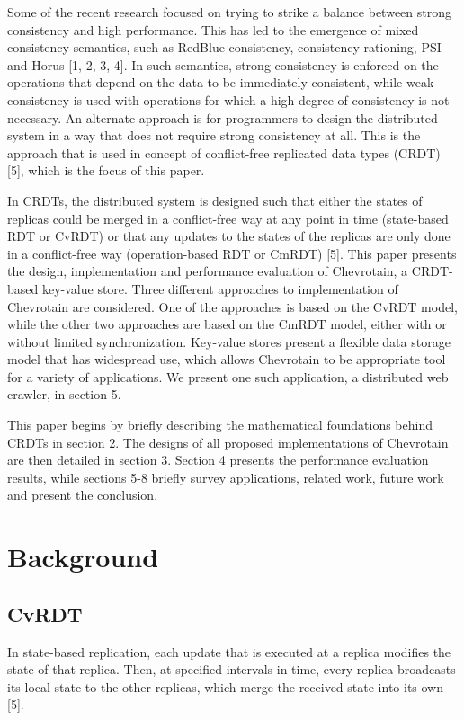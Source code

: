 \documentclass[sigconf,nonacm,10pt]{acmart}
\begin{document}
Some of the recent research focused on trying to strike a balance between strong consistency and high performance. This has led to the emergence of mixed consistency semantics, such as RedBlue consistency, consistency rationing, PSI and Horus [1, 2, 3, 4]. In such semantics, strong consistency is enforced on the operations that depend on the data to be immediately consistent, while weak consistency is used with operations for which a high degree of consistency is not necessary. An alternate approach is for programmers to design the distributed system in a way that does not require strong consistency at all. This is the approach that is used in concept of conflict-free replicated data types (CRDT) [5], which is the focus of this paper.

In CRDTs, the distributed system is designed such that either the states of replicas could be merged in a conflict-free way at any point in time (state-based RDT or CvRDT) or that any updates to the states of the replicas are only done in a conflict-free way (operation-based RDT or CmRDT) [5]. This paper presents the design, implementation and performance evaluation of Chevrotain, a CRDT-based key-value store. Three different approaches to implementation of Chevrotain are considered. One of the approaches is based on the CvRDT model, while the other two approaches are based on the CmRDT model, either with or without limited synchronization.
Key-value stores present a flexible data storage model that has widespread use, which allows Chevrotain to be appropriate tool for a variety of applications. We present one such application, a distributed web crawler, in section 5.

This paper begins by briefly describing the mathematical foundations behind CRDTs in section 2. The designs of all proposed implementations of Chevrotain are then detailed in section 3. Section 4 presents the performance evaluation results, while sections 5-8 briefly survey applications, related work, future work and present the conclusion.

\section{Background}
\subsection{CvRDT}
In state-based replication, each update that is executed at a replica modifies the state of that replica. Then, at specified intervals in time, every replica broadcasts its local state to the other replicas, which merge the received state into its own [5].
\end{document}
